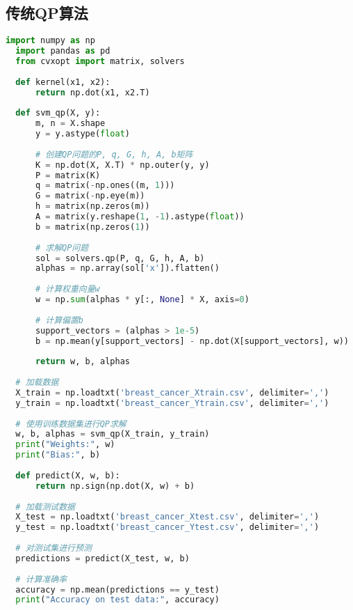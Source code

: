 \documentclass[12pt]{article}
\begin{document}
\subsection{传统QP算法}
\begin{lstlisting}[language=Python]
  import numpy as np
  import pandas as pd
  from cvxopt import matrix, solvers
  
  def kernel(x1, x2):
      return np.dot(x1, x2.T)
  
  def svm_qp(X, y):
      m, n = X.shape
      y = y.astype(float)
      
      # 创建QP问题的P, q, G, h, A, b矩阵
      K = np.dot(X, X.T) * np.outer(y, y)
      P = matrix(K)
      q = matrix(-np.ones((m, 1)))
      G = matrix(-np.eye(m))
      h = matrix(np.zeros(m))
      A = matrix(y.reshape(1, -1).astype(float))
      b = matrix(np.zeros(1))
  
      # 求解QP问题
      sol = solvers.qp(P, q, G, h, A, b)
      alphas = np.array(sol['x']).flatten()
      
      # 计算权重向量w
      w = np.sum(alphas * y[:, None] * X, axis=0)
      
      # 计算偏置b
      support_vectors = (alphas > 1e-5)
      b = np.mean(y[support_vectors] - np.dot(X[support_vectors], w))
      
      return w, b, alphas
  
  # 加载数据
  X_train = np.loadtxt('breast_cancer_Xtrain.csv', delimiter=',')
  y_train = np.loadtxt('breast_cancer_Ytrain.csv', delimiter=',')
  
  # 使用训练数据集进行QP求解
  w, b, alphas = svm_qp(X_train, y_train)
  print("Weights:", w)
  print("Bias:", b)
  
  def predict(X, w, b):
      return np.sign(np.dot(X, w) + b)
  
  # 加载测试数据
  X_test = np.loadtxt('breast_cancer_Xtest.csv', delimiter=',')
  y_test = np.loadtxt('breast_cancer_Ytest.csv', delimiter=',')
  
  # 对测试集进行预测
  predictions = predict(X_test, w, b)
  
  # 计算准确率
  accuracy = np.mean(predictions == y_test)
  print("Accuracy on test data:", accuracy)
    
\end{lstlisting}
\end{document}
